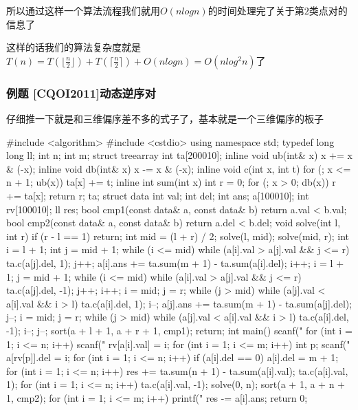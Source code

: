 所以通过这样一个算法流程我们就用$O(nlogn)$的时间处理完了关于第$2$类点对的信息了

这样的话我们的算法复杂度就是$T(n)=T(\lfloor \frac{n}{2} \rfloor)+T(\lceil \frac{n}{2} \rceil)+O(nlogn)=O(nlog^2n)$了

\subsubsection{例题 [CQOI2011]动态逆序对}

仔细推一下就是和三维偏序差不多的式子了，基本就是一个三维偏序的板子

\begin{cppcode}
#include <algorithm>
#include <cstdio>
using namespace std;
typedef long long ll;
int n;
int m;
struct treearray {
  int ta[200010];
  inline void ub(int& x) { x += x & (-x); }
  inline void db(int& x) { x -= x & (-x); }
  inline void c(int x, int t) {
    for (; x <= n + 1; ub(x)) ta[x] += t;
  }
  inline int sum(int x) {
    int r = 0;
    for (; x > 0; db(x)) r += ta[x];
    return r;
  }
} ta;
struct data {
  int val;
  int del;
  int ans;
} a[100010];
int rv[100010];
ll res;
bool cmp1(const data& a, const data& b) { return a.val < b.val; }
bool cmp2(const data& a, const data& b) { return a.del < b.del; }
void solve(int l, int r) {
  if (r - l == 1) {
    return;
  }
  int mid = (l + r) / 2;
  solve(l, mid);
  solve(mid, r);
  int i = l + 1;
  int j = mid + 1;
  while (i <= mid) {
    while (a[i].val > a[j].val && j <= r) {
      ta.c(a[j].del, 1);
      j++;
    }
    a[i].ans += ta.sum(m + 1) - ta.sum(a[i].del);
    i++;
  }
  i = l + 1;
  j = mid + 1;
  while (i <= mid) {
    while (a[i].val > a[j].val && j <= r) {
      ta.c(a[j].del, -1);
      j++;
    }
    i++;
  }
  i = mid;
  j = r;
  while (j > mid) {
    while (a[j].val < a[i].val && i > l) {
      ta.c(a[i].del, 1);
      i--;
    }
    a[j].ans += ta.sum(m + 1) - ta.sum(a[j].del);
    j--;
  }
  i = mid;
  j = r;
  while (j > mid) {
    while (a[j].val < a[i].val && i > l) {
      ta.c(a[i].del, -1);
      i--;
    }
    j--;
  }
  sort(a + l + 1, a + r + 1, cmp1);
  return;
}
int main() {
  scanf("%
  for (int i = 1; i <= n; i++) {
    scanf("%
    rv[a[i].val] = i;
  }
  for (int i = 1; i <= m; i++) {
    int p;
    scanf("%
    a[rv[p]].del = i;
  }
  for (int i = 1; i <= n; i++) {
    if (a[i].del == 0) a[i].del = m + 1;
  }
  for (int i = 1; i <= n; i++) {
    res += ta.sum(n + 1) - ta.sum(a[i].val);
    ta.c(a[i].val, 1);
  }
  for (int i = 1; i <= n; i++) {
    ta.c(a[i].val, -1);
  }
  solve(0, n);
  sort(a + 1, a + n + 1, cmp2);
  for (int i = 1; i <= m; i++) {
    printf("%
    res -= a[i].ans;
  }
  return 0;
}
\end{cppcode}

